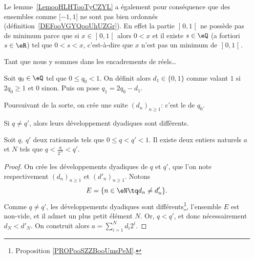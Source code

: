\begin{remark}      \label{REMooXOIOooHjwMvA}
	Le lemme~\ref{LemooHLHTooTyCZYL} a également pour conséquence que des ensembles comme \( \mathopen[ -1 , 1 \mathclose]\) ne sont pas bien ordonnés (définition~\ref{DEFooVGYQooUhUZGr}). En effet la partie \( \mathopen] 0 , 1 \mathclose[\) ne possède pas de minimum parce que si \( x\in \mathopen] 0 , 1 \mathclose[\) alors \( 0<x\) et il existe \( s\in \eQ\) (a fortiori \( s\in \eR\)) tel que \( 0<s<x\), c'est-à-dire que \( x\) n'est pas un minimum de \( \mathopen] 0 , 1 \mathclose[\).
\end{remark}

Tant que nous y sommes dans les encadrements de réels\dots
\begin{normaltext}
	Soit \(q_0 \in \eQ \) tel que \( 0 \leq q_0 < 1 \). On définit alors \( d_1 \in \{0, 1\} \) comme valant \( 1 \) si \( 2 q_0 \geq 1 \) et \(0 \) sinon. Puis on pose \( q_1 = 2 q_0 - d_1 \).

	Poursuivant de la sorte, on crée une suite \( (d_n)_{n\geq 1} \): c'est le  de \( q_0 \).
\end{normaltext}

\begin{proposition}	\label{PROPooSZZBooUmsPeM}
	Si \( q\neq q'\), alors leurs développement dyadiques sont différents.
\end{proposition}


\begin{lemma}        \label{LEMooRSLIooVrZMxM}
	Soit \( q,\ q' \) deux rationnels tels que \( 0 \leq q < q' < 1 \). Il existe deux entiers naturels \( a \) et \( N \) tels que \( q < \frac a {2^N} < q' \).
\end{lemma}
\begin{proof}
	On crée les développements dyadiques de \( q \) et \( q' \), que l'on note respectivement \( (d_n)_{n\geq 1} \) et \( (d'_n)_{n\geq 1} \). Notons
	\begin{equation}
		E = \{ n \in \eN \tq d_n \neq d'_n \}.
	\end{equation}
	Comme \( q \neq q' \), les développements dyadiques sont différents\footnote{Proposition \ref{PROPooSZZBooUmsPeM}.}, l'ensemble \(E\) est non-vide, et il admet un plus petit élément \(N \). Or, \( q < q' \), et donc nécessairement \( d_N < d'_N \). On construit alors \( a = \sum_{i=1}^{N} d_i 2^i \).
\end{proof}

